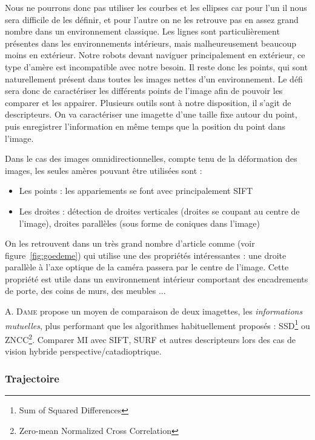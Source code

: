 Nous ne pourrons donc pas utiliser les courbes et les ellipses car pour l'un il nous sera difficile de les définir, et pour l'autre on ne les retrouve pas en assez grand nombre dans un environnement classique.
Les lignes sont particulièrement présentes dans les environnements intérieurs, mais malheureusement beaucoup moins en extérieur.
Notre robots devant naviguer principalement en extérieur, ce type d'amère est incompatible avec notre besoin.
Il reste donc les points, qui sont naturellement présent dans toutes les images nettes d'un environnement.
Le défi sera donc de caractériser les différents points de l'image afin de pouvoir les comparer et les appairer.
Plusieurs outils sont à notre disposition, il s'agit de descripteurs.
On va caractériser une imagette d'une taille fixe autour du point, puis enregistrer l'information en même temps que la position du point dans l'image.

Dans le cas des images omnidirectionnelles, compte tenu de la déformation des images, les seules amères pouvant être utilisées sont :
\begin{itemize}
\item Les points : les appariements se font avec principalement SIFT
\item Les droites : détection de droites verticales (droites se coupant au centre de l'image), droites parallèles (sous forme de coniques dans l'image)
\end{itemize}
On les retrouvent dans un très grand nombre d'article comme \cite{Goedeme07} (voir figure~\ref{fig:goedeme}) qui utilise une des propriétés intéressantes : une droite parallèle à l'axe optique de la caméra passera par le centre de l'image.
Cette propriété est utile dans un environnement intérieur comportant des encadrements de porte, des coins de murs, des meubles ...

A. \textsc{Dame} \cite{Dame10PhD} propose un moyen de comparaison de deux imagettes, les \emph{informations mutuelles}, plus performant que les algorithmes habituellement proposés : SSD\footnote{Sum of Squared Differences} ou ZNCC\footnote{Zero-mean Normalized Cross Correlation}.
Comparer MI avec SIFT, SURF et autres descripteurs lors des cas de vision hybride perspective/catadioptrique.  

\subsubsection{Trajectoire}

